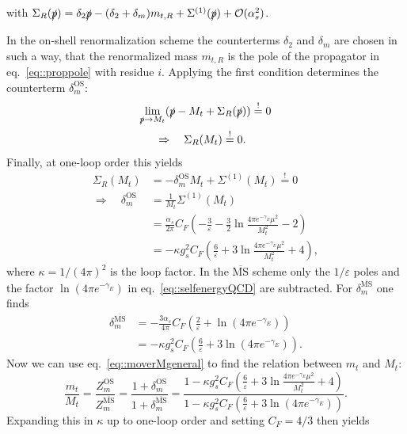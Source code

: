 \documentclass[a4paper,12pt]{book}
\begin{document}
with $\Sigma_R(\slashed{p}) = \delta_2\slashed{p}-(\delta_2+\delta_m) m_{t,R}+\Sigma^{(1)}(\slashed{p})+\mathcal{O}(\alpha_s^2)$.\par
In the on-shell renormalization scheme the counterterms $\delta_2$ and $\delta_m$ are chosen in such a way, that the renormalized mass $m_{t,R}$ is the pole of the propagator in eq.\ \eqref{eq::proppole} with residue $i$. Applying the first condition determines the counterterm $\delta_m^\text{OS}$:
\begin{align}
\lim_{\slashed{p}\rightarrow M_t}(\slashed{p}-M_t&+\Sigma_R(\slashed{p})) \stackrel{!}{=} 0\\
\Rightarrow \quad \Sigma_R(&M_t) \stackrel{!}{=}  0. 
\end{align}
Finally, at one-loop order this yields
\begin{align}
\Sigma_R(M_t) &=-\delta_m^\text{OS} M_t + \Sigma^{(1)}(M_t)\stackrel{!}{=}0\\
\Rightarrow \quad \delta_m^\text{OS} &= \frac{1}{M_t}\Sigma^{(1)}(M_t)\\
&=\frac{\alpha_s}{2\pi} C_F \left(-\frac{3}{\varepsilon}-\frac{3}{2}\ln\frac{4\pi e^{-\gamma_E}\mu^2}{M_t^2}-2\right)\\
&= -\kappa g_s^2 C_F  \left(\frac{6}{\varepsilon}+ 3\ln\frac{4\pi e^{-\gamma_E}\mu^2}{M_t^2}+4\right),
\end{align}
where $\kappa = 1/(4\pi)^2$ is the loop factor. In the $\overline{\text{MS}}$ scheme only the $1/\varepsilon$ poles and the factor $\ln (4\pi e^{-\gamma_E})$ in eq.\ \eqref{eq::selfenergyQCD} are subtracted. For $\delta_m^{\overline{\text{MS}}}$ one finds
\begin{align}
\delta_m^{\overline{\text{MS}}} &= -\frac{3 \alpha_s}{4\pi} C_F \left( \frac{2}{\varepsilon}+\ln (4\pi e^{-\gamma_E})\right)\\
&=-\kappa g_s^2 C_F\left( \frac{6}{\varepsilon}+3 \ln (4\pi e^{-\gamma_E})\right).
\end{align}
Now we can use eq.\ \eqref{eq::moverMgeneral} to find the relation between $m_t$ and $M_t$:
\begin{equation}
\frac{m_t}{M_t} = \frac{Z_m^\text{OS}}{Z_m^{\overline{\text{MS}}}} =\frac{1+\delta_m^\text{OS}}{1+\delta_m^{\overline{\text{MS}}}}= \frac{1-\kappa g_s^2 C_F  \left(\frac{6}{\varepsilon}+ 3\ln\frac{4\pi e^{-\gamma_E}\mu^2}{M_t^2}+4\right)}{1-\kappa g_s^2 C_F\left( \frac{6}{\varepsilon}+3 \ln (4\pi e^{-\gamma_E})\right)}.
\end{equation}
Expanding this in $\kappa$ up to one-loop order and setting $C_F = 4/3$ then yields
\end{document}

